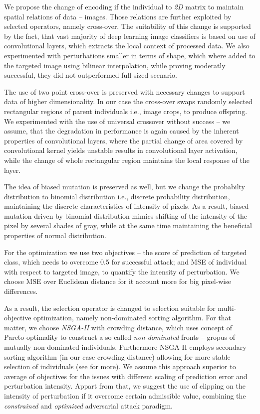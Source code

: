 We propose the change of encoding if the individual to \emph{2D} matrix to maintain spatial relations of data -- images. Those relations are further exploited by selected operators, namely cross-over. The suitability of this change is supported by the fact, that vast majority of deep learning image classifiers is based on use of convolutional layers, which extracts the local context of processed data. We also experimented with perturbations smaller in terms of shape, which where added to the targeted image using bilinear interpolation, while proving moderatly successful, they did not outperformed full sized scenario.

The use of two point cross-over is preserved with necessary changes to support data of higher dimensionality. In our case the cross-over swaps randomly selected rectangular regions of parent individuals i.e., image crops, to produce offspring. We experimented with the use of universal crossover without success -- we assume, that the degradation in performance is again caused by the inherent properties of convolutional layers, where the partial change of area covered by convolutional kernel yields unstable results in convolutional layer activation, while the change of whole rectangular region maintains the local response of the layer.

The idea of biased mutation is preserved as well, but we change the probabilty distribution to binomial distribution i.e., discrete probability distribution, maintaining the discrete characteristics of intensity of pixels. As a result, biased mutation driven by binomial distribution mimics shifting of the intensity of the pixel by several shades of gray, while at the same time maintaining the beneficial properties of normal distribution.

For the optimization we use two objectives -- the score of prediction of targeted class, which needs to overcome 0.5 for successful attack; and MSE of individual with respect to targeted image, to quantify the intensity of perturbation. We choose MSE over Euclidean distance for it account more for big pixel-wise differences.

As a result, the selection operator is changed to selection suitable for multi-objective optimization, namely non-dominated sorting algorithm. For that matter, we choose \emph{NSGA-II} with crowding distance, which uses concept of Pareto-optimality to construct a so called \emph{non-dominated} fronts -- gropus of mutually non-dominated individuals. Furthermore NSGA-II employs secondary sorting algorithm (in our case crowding distance) allowing for more stable selection of individuals (see \cite{nsga} for more). We assume this approach superior to average of objectives for the issues with different scaling of prediction error and perturbation intensity. Appart from that, we suggest the use of clipping on the intensity of perturbation if it overcome certain admissible value, combining the \emph{constrained} and \emph{optimized} adversarial attack paradigm.

